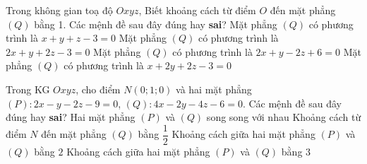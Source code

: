 \begin{ex}%
	Trong không gian toạ độ $Oxyz$, Biết khoảng cách từ điểm $O$ đến mặt phẳng $(Q)$ bằng 1. Các mệnh đề sau đây đúng hay \textbf{sai}?
	\choiceTF
	{Mặt phẳng $(Q)$ có phương trình là $x + y + z-3 = 0$}
	{\True Mặt phẳng $(Q)$ có phương trình là $2x + y + 2z-3 = 0$}
	{Mặt phẳng $(Q)$ có phương trình là $2x + y- 2z + 6 = 0$}
	{\True Mặt phẳng $(Q)$ có phương trình là $x + 2y + 2z-3= 0$}
\end{ex}

\begin{ex}%
	Trong KG $Oxyz$, cho điểm $N(0;1;0)$ và hai mặt phẳng $(P)\colon 2x-y-2z-9=0$, $(Q)\colon 4x-2y-4z-6=0$. Các mệnh đề sau đây đúng hay \textbf{sai}?
	\choiceTF
	{\True Hai mặt phẳng $(P)$ và $(Q)$ song song với nhau}
	{Khoảng cách từ điểm $N$ đến mặt phẳng $(Q)$ bằng $\dfrac{1}{2}$}
	{\True Khoảng cách giữa hai mặt phẳng $(P)$ và $(Q)$ bằng $2$}
	{Khoảng cách giữa hai mặt phẳng $(P)$ và $(Q)$ bằng $3$}
\end{ex}

